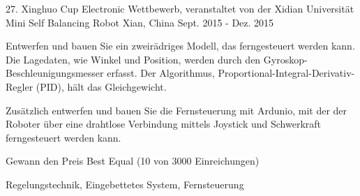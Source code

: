 \begin{cventries}
  \cventry
    {27. Xinghuo Cup Electronic Wettbewerb, veranstaltet von der Xidian Universität} %
    {Mini Self Balancing Robot} %
    {Xian, China} %
    {Sept. 2015 - Dez. 2015} %
    {
      \begin{cvitems} %
        \item {Entwerfen und bauen Sie ein zweirädriges Modell, das ferngesteuert werden kann. Die Lagedaten, wie Winkel und Position, werden durch den Gyroskop-Beschleunigungsmesser erfasst. Der Algorithmus, Proportional-Integral-Derivativ-Regler (PID), hält das Gleichgewicht. }
       \item {Zusätzlich entwerfen und bauen Sie die Fernsteuerung mit Ardunio, mit der der Roboter über eine drahtlose Verbindung mittels Joystick und Schwerkraft ferngesteuert werden kann.}
       \item {Gewann den Preis Best Equal (10 von 3000 Einreichungen)}
      \end{cvitems}
    }{Regelungstechnik, Eingebettetes System, Fernsteuerung}

\end{cventries}
